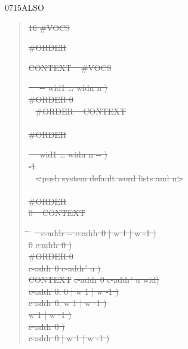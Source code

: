 \begin{worddef}{0715}{ALSO}
\begin{rationale}
		\begin{quote}\ttfamily
		\sout{16  \#VOCS}

		\sout{ \#ORDER}

		\sout{ CONTEXT ~ \#VOCS  }

		\sout{\word{:} ~~ -{}- wid1 {\ldots} widn n )} \\
		\tab \sout{\#ORDER  0 } \\
		\tab~ \sout{\#ORDER  ~  \word{-}
			    CONTEXT \word{+} } \\
		\tab \sout{} \\
		\tab \sout{\#ORDER } \\
		\sout{\word{;}}

		\sout{\word{:} ~~ wid1 {\ldots} widn n -{}- )} \\
		\tab \sout{ -1 \word{=} } \\
		\tab~ \sout{ <push system default word lists and n>} \\
		\tab \sout{} \\
		\tab \sout{ \#ORDER \word{!}} \\
		\tab \sout{0  ~
			  CONTEXT \word{+} \word{!}
		} \\
		\sout{\word{;}}

		\begin{tabbing}
		\tab \= \tab \= \tab \= \hspace{10.5em} \= \kill
		\+ \sout{\word{:} ~  c-addr -{}- c-addr 0 | w 1 | w -1 )} \\
				\sout{0}												\>\>\> \sout{ c-addr 0 )} \\
			\+	\sout{\#ORDER  0 } \\
				\sout{ }						\>\> \sout{ c-addr 0 c-addr' u )} \\
				\sout{  CONTEXT \word{+} }	\>\> \sout{ c-addr 0 c-addr' u wid)} \\
				\sout{}					\>\> \sout{ c-addr 0; 0 | w 1 | w -1 )} \\
				\sout{ }							\>\> \sout{\word{p} c-addr 0; w 1 | w -1 )} \\
				\> \sout{  }		\>	 \sout{ w 1 | w -1 )} \\
			\-	\sout{}										\>\> \sout{ c-addr 0 )} \\
		\-	\sout{}											\>\>\> \sout{ c-addr 0 | w 1 | w -1 )} \\
		\sout{\word{;}}
		\end{tabbing}
		\end{quote}


\end{rationale}
\end{worddef}
